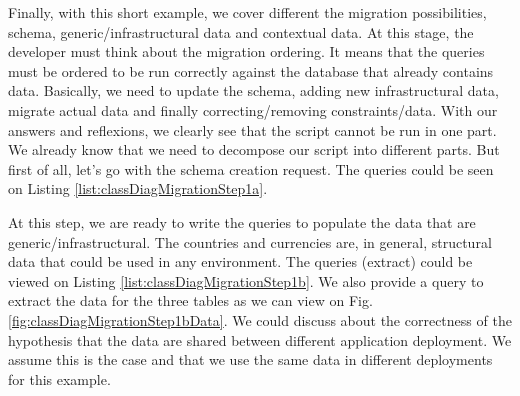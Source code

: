 Finally, with this short example, we cover different the migration possibilities, schema, generic/infrastructural data and contextual data. At this stage, the developer must think about the migration ordering. It means that the queries must be ordered to be run correctly against the database that already contains data. Basically, we need to update the schema, adding new infrastructural data, migrate actual data and finally correcting/removing constraints/data. With our answers and reflexions, we clearly see that the script cannot be run in one part. We already know that we need to decompose our script into different parts. But first of all, let's go with the schema creation request. The queries could be seen on Listing \ref{list:classDiagMigrationStep1a}.



At this step, we are ready to write the queries to populate the data that are generic/infrastructural. The countries and currencies are, in general, structural data that could be used in any environment. The queries (extract) could be viewed on Listing \ref{list:classDiagMigrationStep1b}. We also provide a query to extract the data for the three tables as we can view on Fig. \ref{fig:classDiagMigrationStep1bData}. We could discuss about the correctness of the hypothesis that the data are shared between different application deployment. We assume this is the case and that we use the same data in different deployments for this example.



